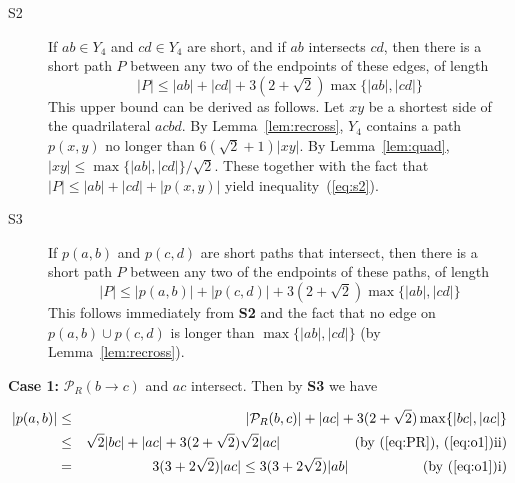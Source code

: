 \pdfoutput=1  \documentclass[11pt]{article}
\newcommand{\Pa}{{\mathcal P}}
\begin{document}
\begin{description}
\item[S2]
If $ab \in Y_4$ and $cd \in Y_4$ are short, and if
$ab$ intersects $cd$, then there is a short path $P$ between any two of the endpoints
of these edges, of length \begin{equation}
|P| \le |ab| + |cd| + 3(2+\sqrt{2})\max\{|ab|, |cd|\}
\label{eq:s2}
\end{equation}
This upper bound can be derived as follows. Let $xy$ be a shortest side of
the quadrilateral $acbd$. By Lemma~\ref{lem:recross}, $Y_4$
contains a path $p(x, y)$ no longer than $6(\sqrt{2}+1)|xy|$.
By Lemma~\ref{lem:quad}, $|xy| \le \max\{|ab|, |cd|\}/\sqrt{2}$.
These together with the fact that
$|P| \le |ab| +|cd| +|p(x,y)|$ yield inequality~(\ref{eq:s2}).
\item[S3]
If $p(a,b)$ and $p(c,d)$ are short paths that intersect,
then there is a short path $P$ between any two of the endpoints
of these paths, of length \begin{equation}
|P| \le |p(a,b)| + |p(c,d)| + 3(2+\sqrt{2})\max\{|ab|, |cd|\}
\label{eq:s3}
\end{equation}
This follows immediately from {\bf S2} and the fact that
no edge on $p(a,b) \cup p(c,d)$ is longer than $\max\{|ab|, |cd|\}$ (by Lemma~\ref{lem:recross}).
\end{description}

\medskip
\noindent
{\bf Case 1:} $\Pa_R(b \rightarrow c)$ and $ac$ intersect. Then by {\bf S3} we have

\begin{eqnarray*}
\nonumber |p(a,b)| & \le & |\Pa_R(b,c)| + |ac| + 3(2+\sqrt{2}) \max\{|bc|, |ac|\} \\
                   & \le & \sqrt{2}|bc| + |ac| + 3(2+\sqrt{2})\sqrt{2}|ac| ~~~~~~~~~~~~~~~~\mbox{(by~(\ref{eq:PR}),~(\ref{eq:o1})ii)} \\
                   & = & 3(3+2\sqrt{2})|ac| \le 3(3+2\sqrt{2})|ab| ~~~~~~~~~~~~~~~~\mbox{(by~({\ref{eq:o1}})i)} \\
\label{eq:o2}
\end{eqnarray*}
\end{document}
